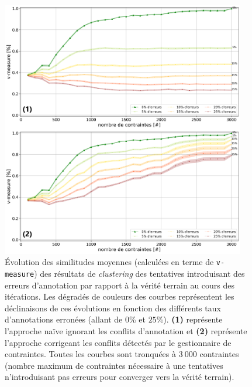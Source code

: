 			\begin{figure}[!htb]
				\centering
				\includegraphics[width=0.95\textwidth]{figures/etude-robustesse-erreurs-et-corrections-closest}
				\caption{
					Évolution des similitudes moyennes (calculées en terme de \texttt{v-measure}) des résultats de \textit{clustering} des tentatives introduisant des erreurs d'annotation par rapport à la vérité terrain au cours des itérations.
					Les dégradés de couleurs des courbes représentent les déclinaisons de ces évolutions en fonction des différents taux d'annotations erronées (allant de $0$\% et $25$\%).
					\textbf{(1)} représente l'approche naïve ignorant les conflits d'annotation
					et \textbf{(2)} représente l'approche corrigeant les conflits détectés par le gestionnaire de contraintes.
					Toutes les courbes sont tronquées à $3~000$ contraintes (nombre maximum de contraintes nécessaire à une tentatives n'introduisant pas erreurs pour converger vers la vérité terrain).
				}
				\label{figure:4.6.2-ETUDE-ROBUSTESSE-ERREURS-ANNOTATION-ET-CORRECTION}
			\end{figure}
			

